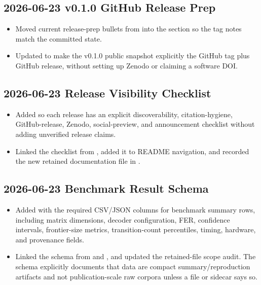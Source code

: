\subsection*{2026-06-23 v0.1.0 GitHub Release Prep}

\begin{itemize}
\item Moved current release-prep bullets from \texttt{} \texttt{} into the \texttt{} section so the tag notes match the committed \texttt{} state.
\item Updated \texttt{} to make the v0.1.0 public snapshot explicitly the GitHub tag plus GitHub release, without setting up Zenodo or claiming a software DOI.
\end{itemize}

\subsection*{2026-06-23 Release Visibility Checklist}

\begin{itemize}
\item Added \texttt{} so each release has an explicit discoverability, citation-hygiene, GitHub-release, Zenodo, social-preview, and announcement checklist without adding unverified release claims.
\item Linked the checklist from \texttt{}, added it to README navigation, and recorded the new retained documentation file in \texttt{}.
\end{itemize}

\subsection*{2026-06-23 Benchmark Result Schema}

\begin{itemize}
\item Added \texttt{} with the required CSV/JSON columns for benchmark summary rows, including matrix dimensions, decoder configuration, FER, confidence intervals, frontier-size metrics, transition-count percentiles, timing, hardware, and provenance fields.
\item Linked the schema from \texttt{} and \texttt{}, and updated the retained-file scope audit. The schema explicitly documents that \texttt{} data are compact summary/reproduction artifacts and not publication-scale raw corpora unless a file or sidecar says so.
\end{itemize}

